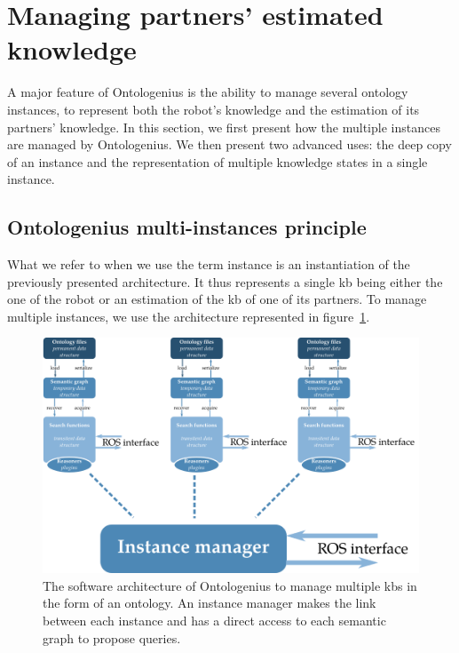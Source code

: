 \section{Managing partners' estimated knowledge}

A major feature of Ontologenius is the ability to manage several ontology instances, to represent both the robot's knowledge and the estimation of its partners' knowledge. In this section, we first present how the multiple instances are managed by Ontologenius. We then present two advanced uses: the deep copy of an instance and the representation of multiple knowledge states in a single instance.

\subsection{Ontologenius multi-instances principle}

What we refer to when we use the term instance is an instantiation of the previously presented architecture. It thus represents a single \acrlong{kb} being either the one of the robot or an estimation of the \acrlong{kb} of one of its partners. To manage multiple instances, we use the architecture represented in figure~\ref{fig:chap2_archi_multi}.

\begin{figure}[ht!]
\centering
\includegraphics[width=\textwidth]{figures/chapter2/archi_multi.png}
\caption{\label{fig:chap2_archi_multi} The software architecture of Ontologenius to manage multiple \acrlong{kb}s in the form of an ontology. An instance manager makes the link between each instance and has a direct access to each semantic graph to propose queries. }
\end{figure}

